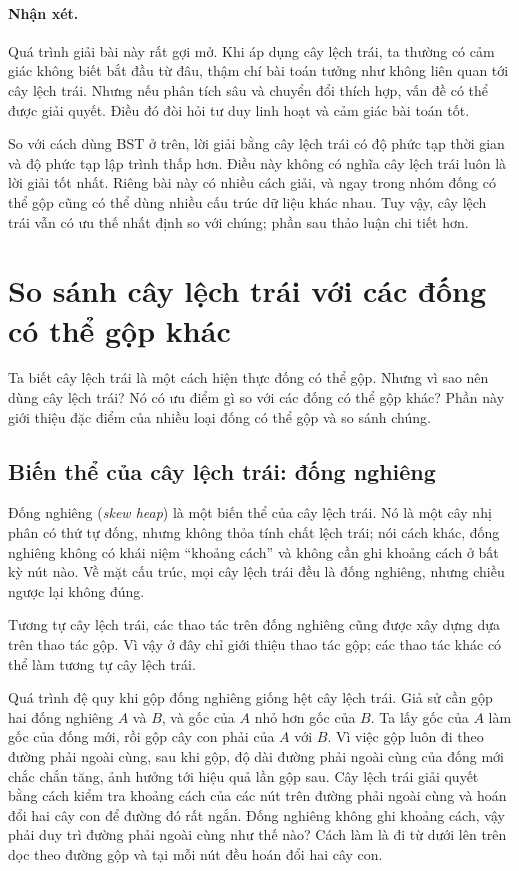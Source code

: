 \documentclass[11pt]{article}
\begin{document}
\paragraph{Nhận xét.}
Quá trình giải bài này rất gợi mở. Khi áp dụng cây lệch trái, ta thường có cảm
giác không biết bắt đầu từ đâu, thậm chí bài toán tưởng như không liên quan tới
cây lệch trái. Nhưng nếu phân tích sâu và chuyển đổi thích hợp, vấn đề có thể
được giải quyết. Điều đó đòi hỏi tư duy linh hoạt và cảm giác bài toán tốt.

So với cách dùng BST ở trên, lời giải bằng cây lệch trái có độ phức tạp thời
gian và độ phức tạp lập trình thấp hơn. Điều này không có nghĩa cây lệch trái
luôn là lời giải tốt nhất. Riêng bài này có nhiều cách giải, và ngay trong nhóm
đống có thể gộp cũng có thể dùng nhiều cấu trúc dữ liệu khác nhau. Tuy vậy, cây
lệch trái vẫn có ưu thế nhất định so với chúng; phần sau thảo luận chi tiết hơn.

\section{So sánh cây lệch trái với các đống có thể gộp khác}

Ta biết cây lệch trái là một cách hiện thực đống có thể gộp. Nhưng vì sao nên
dùng cây lệch trái? Nó có ưu điểm gì so với các đống có thể gộp khác? Phần này
giới thiệu đặc điểm của nhiều loại đống có thể gộp và so sánh chúng.

\subsection{Biến thể của cây lệch trái: đống nghiêng}

Đống nghiêng (\emph{skew heap}) là một biến thể của cây lệch trái. Nó là một cây
nhị phân có thứ tự đống, nhưng không thỏa tính chất lệch trái; nói cách khác,
đống nghiêng không có khái niệm ``khoảng cách'' và không cần ghi khoảng cách ở
bất kỳ nút nào. Về mặt cấu trúc, mọi cây lệch trái đều là đống nghiêng, nhưng
chiều ngược lại không đúng.

Tương tự cây lệch trái, các thao tác trên đống nghiêng cũng được xây dựng dựa
trên thao tác gộp. Vì vậy ở đây chỉ giới thiệu thao tác gộp; các thao tác khác
có thể làm tương tự cây lệch trái.

Quá trình đệ quy khi gộp đống nghiêng giống hệt cây lệch trái. Giả sử cần gộp
hai đống nghiêng \(A\) và \(B\), và gốc của \(A\) nhỏ hơn gốc của \(B\). Ta lấy
gốc của \(A\) làm gốc của đống mới, rồi gộp cây con phải của \(A\) với \(B\).
Vì việc gộp luôn đi theo đường phải ngoài cùng, sau khi gộp, độ dài đường phải
ngoài cùng của đống mới chắc chắn tăng, ảnh hưởng tới hiệu quả lần gộp sau.
Cây lệch trái giải quyết bằng cách kiểm tra khoảng cách của các nút trên đường
phải ngoài cùng và hoán đổi hai cây con để đường đó rất ngắn. Đống nghiêng không
ghi khoảng cách, vậy phải duy trì đường phải ngoài cùng như thế nào? Cách làm
là đi từ dưới lên trên dọc theo đường gộp và tại mỗi nút đều hoán đổi hai cây
con.
\end{document}
